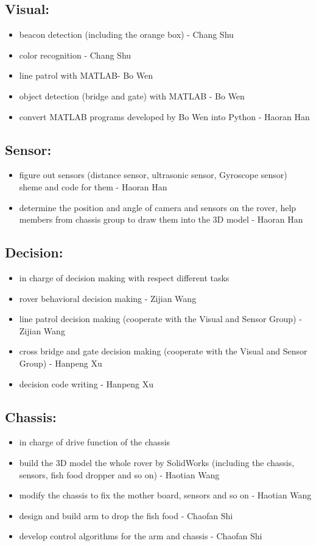 \subsection*{Visual:}
\begin{itemize}
    \item beacon detection (including the orange box) - Chang Shu
    \item color recognition - Chang Shu
    \item line patrol with MATLAB- Bo Wen
    \item object detection (bridge and gate) with MATLAB - Bo Wen
    \item convert MATLAB programs developed by Bo Wen into Python - Haoran Han
\end{itemize}

\subsection*{Sensor:} 
\begin{itemize}
    \item figure out sensors (distance sensor, ultrasonic sensor, Gyroscope sensor) sheme and code for them - Haoran Han
    \item determine the position and angle of camera and sensors on the rover, help members from chassis group to draw them into the 3D model - Haoran Han
\end{itemize}

\subsection*{Decision:}
\begin{itemize}
    \item in charge of decision making with respect different tasks
    \item rover behavioral decision making - Zijian Wang
    \item line patrol decision making (cooperate with the Visual and Sensor Group) - Zijian Wang
    \item cross bridge and gate decision making (cooperate with the Visual and Sensor Group) - Hanpeng Xu
    \item decision code writing - Hanpeng Xu
\end{itemize}

\subsection*{Chassis:}
\begin{itemize}
    \item in charge of drive function of the chassis
    \item build the 3D model the whole rover by SolidWorks (including the chassis, sensors, fish food dropper and so on) - Haotian Wang
    \item modify the chassis to fix the mother board, sensors and so on - Haotian Wang
    \item design and build arm to drop the fish food - Chaofan Shi
    \item develop control algorithms for the arm and chassis - Chaofan Shi
\end{itemize}

